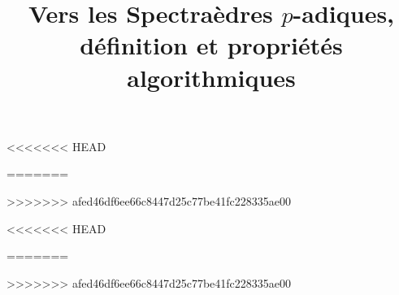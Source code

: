\documentclass[twoside,a4paper]{article}
\title{
	Vers les Spectraèdres \texorpdfstring{$p$}{p}-adiques, définition et propriétés algorithmiques
}
\begin{document}

    
 
    \tableofcontents
<<<<<<< HEAD
    
 
     
    
    
     


=======

    \newpage
    
     
    

    
    
    
    
     
>>>>>>> afed46df6ee66c8447d25c77be41fc228335ae00

    \newpage
    \appendix
<<<<<<< HEAD
     
         
     

=======
    
    
    

    \newpage
>>>>>>> afed46df6ee66c8447d25c77be41fc228335ae00
    \printbibliography
    
\end{document}
